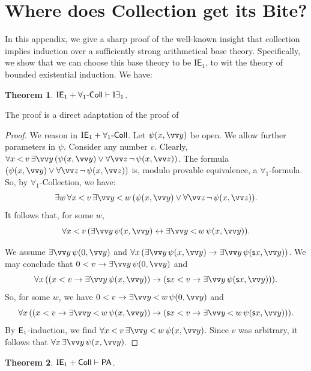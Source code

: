 \documentclass{amsart}
\renewcommand{\iff}{\leftrightarrow}
\newtheorem{theorem}{Theorem}[section]
\newcommand{\bles}{\mathbin{<}}
\newcommand{\hyph}{\mbox{-}}
\begin{document}
\section{Where does Collection get its Bite?}\label{collectionsmurf}
In this appendix, we give a sharp proof of the well-known insight that collection implies
induction over a sufficiently strong arithmetical base theory. Specifically, we show that
we can choose this base theory to be  $\mathrm I \mathsf E_1$, to wit the theory of bounded existential induction.
We have:
 
 \begin{theorem}
 $\mathrm I \mathsf E_1 + \forall_1 \hyph {\sf Coll}\vdash \mathrm I\exists_1$.
 \end{theorem}
 
 The proof is a direct adaptation of the proof of \cite[Lemma 7.4, p84]{kaye:mode91}

\begin{proof}
We reason in $\mathrm I \mathsf E_1 + \forall_1 \hyph {\sf Coll}$. Let $\psi(x,\vv y)$ be open. We allow further parameters in $\psi$.
Consider any number $v$. Clearly,
$\forall x \bles v\,  \exists \vv y \, (\psi( x,\vv y) \vee \forall \vv z\, \neg\, \psi(x,\vv z))$. The formula
$ (\psi(x,\vv y) \vee \forall \vv z\, \neg\, \psi(x,\vv z))$ is, modulo provable equivalence, a $\forall_1$-formula.
So, by $\forall_1$-Collection, we have:
\[ \exists w\, \forall  x \bles v\,  \exists \vv y\bles w \, (\psi( x,\vv y) \vee \forall \vv z\, \neg\, \psi(x,\vv z)).\]
It follows that, for some $w$,
\[   \forall  x \bles v\, (\exists \vv y\, \psi( x,\vv y) \iff \exists \vv y\bles w\, \psi( x,\vv y)). \]

We assume $\exists \vv y\,\psi(0,\vv y)$ and $\forall x\, (\exists \vv y\,\psi(x,\vv y) \to \exists \vv y\,\psi({\sf s}x,\vv y))$.
We may conclude  that $0< v\to \exists \vv y\, \psi(0,\vv y)$ and \[\forall x\, ((x<v\to \exists \vv y\,\psi(x,\vv y)) \to ({\sf s}x< v\to \exists \vv y\,\psi({\sf s}x,\vv y))).\]
So, for some $w$, we have $0< v\to \exists \vv y\bles w\, \psi(0,\vv y)$ and 
 \[\forall x\, ((x<v\to \exists \vv y\bles w\,\psi(x,\vv y)) \to ({\sf s}x< v\to \exists \vv y\bles w\,\psi({\sf s}x,\vv y))).\]
By ${\sf E}_1$-induction, we find $\forall x\bles v\, \exists \vv y \bles w\, \psi(x,\vv y)$. Since $v$ was arbitrary, it follows that
$\forall x\, \exists \vv y \, \psi(x,\vv y)$. 
  \end{proof}
  
  \begin{theorem}
 $\mathrm I \mathsf E_1 +  {\sf Coll}\vdash {\sf PA}$.
 \end{theorem}
 
\end{document}
